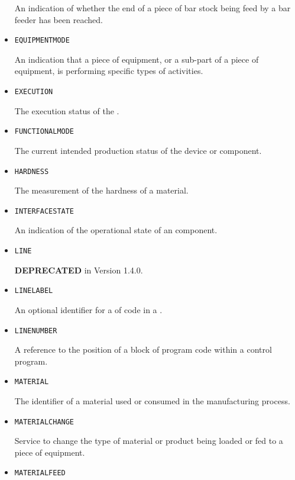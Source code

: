 \begin{itemize}
An indication of whether the end of a piece of bar stock being feed by a bar feeder has been reached.


\item \texttt{EQUIPMENT\textunderscore MODE}  

An indication that a piece of equipment, or a sub-part of a piece of equipment, is performing specific types of activities.


\item \texttt{EXECUTION}  

The execution status of the .


\item \texttt{FUNCTIONAL\textunderscore MODE}  

The current intended production status of the device or component.


\item \texttt{HARDNESS}  

The measurement of the hardness of a material.


\item \texttt{INTERFACE\textunderscore STATE}  

An indication of the operational state of an  component.


\item \texttt{LINE}  

\textbf{DEPRECATED} in Version 1.4.0.


\item \texttt{LINE\textunderscore LABEL}  

An optional identifier for a  of code in a .


\item \texttt{LINE\textunderscore NUMBER}  

A reference to the position of a block of program code within a control program.


\item \texttt{MATERIAL}  

The identifier of a material used or consumed in the manufacturing process.


\item \texttt{MATERIAL\textunderscore CHANGE}  

Service to change the type of material or product being loaded or fed to a piece of equipment.


\item \texttt{MATERIAL\textunderscore FEED}  


\end{itemize}

